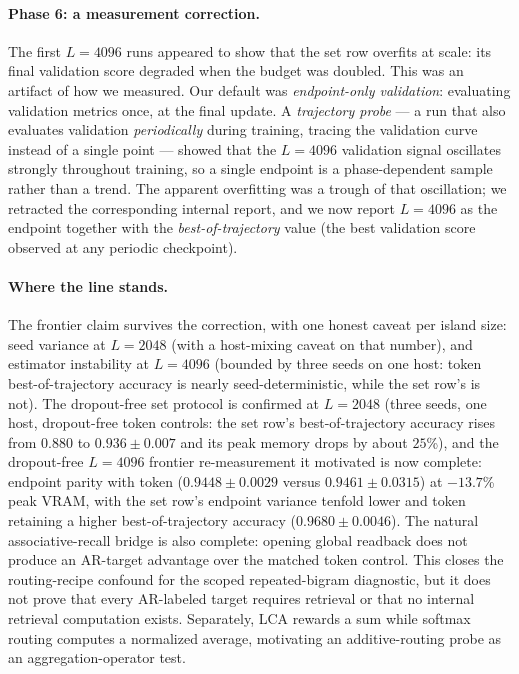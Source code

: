 \documentclass{article}
\theoremstyle{plain}
\theoremstyle{definition}
\theoremstyle{remark}
\begin{document}
\paragraph{Phase 6: a measurement correction.}  The first $L=4096$ runs
appeared to show that the set row overfits at scale: its final validation
score degraded when the budget was doubled.  This was an artifact of how we
measured.  Our default was \emph{endpoint-only validation}: evaluating
validation metrics once, at the final update.  A \emph{trajectory probe} ---
a run that also evaluates validation \emph{periodically} during training,
tracing the validation curve instead of a single point --- showed that the
$L=4096$ validation signal oscillates strongly throughout training, so a
single endpoint is a phase-dependent sample rather than a trend.  The
apparent overfitting was a trough of that oscillation; we retracted the
corresponding internal report, and we now report $L=4096$ as the endpoint
together with the \emph{best-of-trajectory} value (the best validation score
observed at any periodic checkpoint).

\paragraph{Where the line stands.}  The frontier claim survives the
correction, with one honest caveat per island size: seed variance at
$L=2048$ (with a host-mixing caveat on that number), and estimator
instability at $L=4096$ (bounded by three seeds on one host: token
best-of-trajectory accuracy is nearly seed-deterministic, while the set row's
is not).  The dropout-free set protocol is confirmed at $L=2048$ (three seeds, one host,
dropout-free token controls: the set row's best-of-trajectory accuracy rises from
$0.880$ to $0.936 \pm 0.007$ and its peak memory drops by about $25$\%),
and the dropout-free $L=4096$ frontier re-measurement it motivated is now
complete: endpoint parity with token ($0.9448\pm0.0029$ versus
$0.9461\pm0.0315$) at $-13.7$\% peak VRAM, with the set row's endpoint
variance tenfold lower and token retaining a higher best-of-trajectory
accuracy ($0.9680\pm0.0046$).  The natural associative-recall bridge is also
complete: opening global readback does not produce an AR-target advantage over
the matched token control.  This closes the routing-recipe confound for the
scoped repeated-bigram diagnostic, but it does not prove that every AR-labeled
target requires retrieval or that no internal retrieval computation exists.
Separately, LCA rewards a sum while softmax routing computes a normalized
average, motivating an additive-routing probe as an aggregation-operator test.
\end{document}
